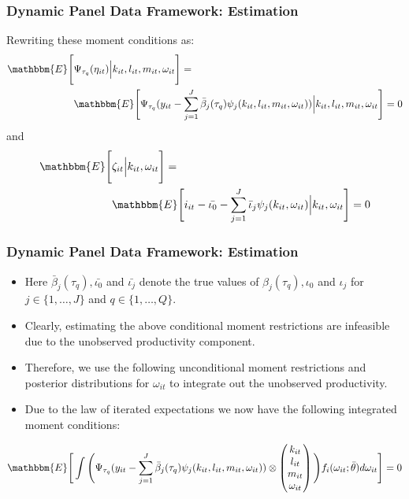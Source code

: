 \documentclass{beamer}
\begin{document}

\begin{frame}
\frametitle{Dynamic Panel Data Framework: Estimation}
Rewriting these moment conditions as:
\begin{equation}\label{ymoment}
\begin{split}
\mathbbm{E}\Bigg[&\Psi_{\tau_{q}}(\eta_{it})\Big|k_{it}, l_{it}, m_{it}, \omega_{it}\Bigg]=\\
&\mathbbm{E}\Bigg[\Psi_{\tau_{q}}(y_{it}-\sum_{j=1}^{J}\bar{\beta}_{j}(\tau_{q})\psi_{j}(k_{it}, l_{it}, m_{it}, \omega_{it}))\Big|k_{it}, l_{it}, m_{it}, \omega_{it}\Bigg]=0
\end{split}
\end{equation}
and 
\begin{equation}\label{imoment}
\begin{split}
\mathbbm{E}\Bigg[&\zeta_{it}\Big|k_{it}, \omega_{it}\Bigg]=\\
&\mathbbm{E}\Bigg[i_{it}-\bar{\iota_{0}}-\sum_{j=1}^{J}\bar{\iota}_{j}\psi_{j}(k_{it}, \omega_{it})\Big|k_{it}, \omega_{it}\Bigg]=0
\end{split}
\end{equation}
\end{frame}


\begin{frame}
\frametitle{Dynamic Panel Data Framework: Estimation}
\begin{itemize}
	\item Here $\bar{\beta}_{j}(\tau_{q}), \bar{\iota_{0}}$ and $\bar{\iota_{j}}$ denote the true values of $\beta_{j}(\tau_{q}), \iota_{0}$ and $\iota_{j}$ for $j\in\{1,\dots, J\}$ and $q\in\{1,\dots,Q\}$. 
	\item Clearly, estimating the above conditional moment restrictions are infeasible due to the unobserved productivity component. 
	\item Therefore, we use the following unconditional moment restrictions and posterior distributions for $\omega_{it}$ to integrate out the unobserved productivity. 
	\item Due to the law of iterated expectations we now have the following integrated moment conditions:
\end{itemize}
\small
\begin{equation}\label{yimc}
\mathbbm{E}\Bigg[\int\Bigg(\Psi_{\tau_{q}}(y_{it}-\sum_{j=1}^{J}\bar{\beta}_{j}(\tau_{q})\psi_{j}(k_{it}, l_{it}, m_{it}, \omega_{it}))\otimes
\begin{pmatrix}
k_{it} \\
l_{it}\\
m_{it} \\
\omega_{it} 
\end{pmatrix}
\Bigg)f_{i}(\omega_{it};\bar{\theta})d\omega_{it}\Bigg]=0
\end{equation}
\end{frame}
\end{document}
